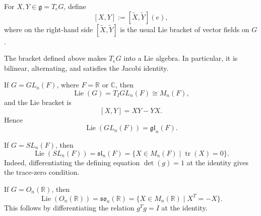 \begin{definition}
    For \(X,Y\in \mathfrak g=T_eG\), define
    \[
        [X,Y]:=[\widetilde X,\widetilde Y](e),
    \]
    where on the right-hand side \([\widetilde X,\widetilde Y]\) is the usual Lie bracket of vector fields on \(G\).
\end{definition}

\begin{proposition}
    The bracket defined above makes \(T_eG\) into a Lie algebra. In particular, it is bilinear, alternating, and satisfies the Jacobi identity.
\end{proposition}

\begin{example}
    If \(G=GL_n(F)\), where \(F=\mathbb R\) or \(\mathbb C\), then
    \[
        \operatorname{Lie}(G)=T_IGL_n(F)\cong M_n(F),
    \]
    and the Lie bracket is
    \[
        [X,Y]=XY-YX.
    \]
    Hence
    \[
        \operatorname{Lie}(GL_n(F))=\mathfrak{gl}_n(F).
    \]
\end{example}

\begin{example}
    If \(G=SL_n(F)\), then
    \[
        \operatorname{Lie}(SL_n(F))=\mathfrak{sl}_n(F)
        =\{X\in M_n(F)\mid \operatorname{tr}(X)=0\}.
    \]
    Indeed, differentiating the defining equation \(\det(g)=1\) at the identity gives the trace-zero condition.
\end{example}

\begin{example}
    If \(G=O_n(\mathbb R)\), then
    \[
        \operatorname{Lie}(O_n(\mathbb R))=\mathfrak{so}_n(\mathbb R)
        =\{X\in M_n(\mathbb R)\mid X^T=-X\}.
    \]
    This follows by differentiating the relation \(g^Tg=I\) at the identity.
\end{example}

